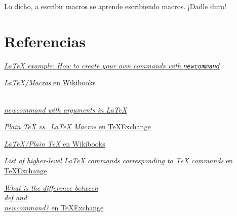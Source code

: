 Lo dicho, a escribir macros se aprende escribiendo macros. ¡Dadle duro!

\section{Referencias}\label{referencias}

\href{http://alvinalexander.com/blog/post/latex/create-your-own-commands-in-latex-using-newcommand}{\emph{LaTeX
example: How to create your own commands with \lstinline!newcommand!}}

\href{https://en.wikibooks.org/wiki/LaTeX/Macros}{\emph{LaTeX/Macros} en
Wikibooks}

\href{http://www.shawnlankton.com/2008/01/newcommand-with-argument-in-latex/}{\emph{\\newcommand
with arguments in LaTeX}}

\href{https://tex.stackexchange.com/questions/35564/plain-tex-vs-latex-macros}{\emph{Plain
TeX vs.~LaTeX Macros} en TeXExchange}

\href{https://en.wikibooks.org/wiki/LaTeX/Plain_TeX}{\emph{LaTeX/Plain
TeX} en Wikibooks}

\href{https://tex.stackexchange.com/questions/26742/list-of-higher-level-latex-commands-corresponding-to-tex-commands/26922\#26922}{\emph{List
of higher-level LaTeX commands corresponding to TeX commands} en
TeXExchange}

\href{https://tex.stackexchange.com/questions/655/what-is-the-difference-between-def-and-newcommand}{\emph{What
is the difference between \\def and \\newcommand?} en TeXExchange}
